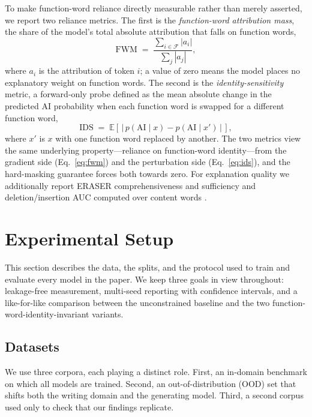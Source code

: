 \documentclass[10pt,twocolumn]{article}
\begin{document}
To make function-word reliance directly measurable rather than merely asserted, we report two reliance metrics. The first is the \emph{function-word attribution mass}, the share of the model's total absolute attribution that falls on function words,
\begin{equation}
\mathrm{FWM} \;=\; \frac{\sum_{i \in \mathcal{F}} |a_i|}{\sum_{j} |a_j|},
\label{eq:fwm}
\end{equation}
where $a_i$ is the attribution of token $i$; a value of zero means the model places no explanatory weight on function words. The second is the \emph{identity-sensitivity} metric, a forward-only probe defined as the mean absolute change in the predicted AI probability when each function word is swapped for a different function word,
\begin{equation}
\mathrm{IDS} \;=\; \mathbb{E}\!\left[\,\big|\,p(\text{AI}\mid x) - p(\text{AI}\mid x')\,\big|\,\right],
\label{eq:ids}
\end{equation}
where $x'$ is $x$ with one function word replaced by another. The two metrics view the same underlying property---reliance on function-word identity---from the gradient side (Eq.~\ref{eq:fwm}) and the perturbation side (Eq.~\ref{eq:ids}), and the hard-masking guarantee forces both towards zero. For explanation quality we additionally report ERASER comprehensiveness and sufficiency \cite{eraser} and deletion/insertion AUC computed over content words \cite{rise}.

\section{Experimental Setup}
This section describes the data, the splits, and the protocol used to train and evaluate every model in the paper. We keep three goals in view throughout: leakage-free measurement, multi-seed reporting with confidence intervals, and a like-for-like comparison between the unconstrained baseline and the two function-word-identity-invariant variants.

\subsection{Datasets}
We use three corpora, each playing a distinct role. First, an in-domain benchmark on which all models are trained. Second, an out-of-distribution (OOD) set that shifts both the writing domain and the generating model. Third, a second corpus used only to check that our findings replicate.
\end{document}
